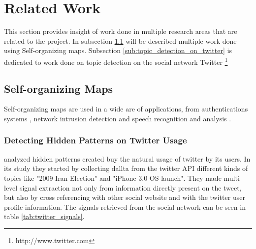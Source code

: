 \section{Related Work} %
\label{sec:related_work}

This section provides insight of work done in multiple research areas that are related to the project. In subsection \ref{sub:self_organizing_maps} will be described multiple work done using Self-organizing maps. Subsection \ref{sub:topic_detection_on_twitter} is dedicated to work done on topic detection on the social network Twitter \footnote{http://www.twitter.com}

\subsection{Self-organizing Maps} %
\label{sub:self_organizing_maps}
Self-organizing maps are used in a wide are of applications, from authentications systems \cite{Dozono2012}, network intrusion detection \cite{intrusion_som} and speech recognition and analysis \cite{phonetic_typewiter}.

\subsubsection{Detecting Hidden Patterns on Twitter Usage} %
\label{ssub:detecting_hidden_patterns_on_twitter_usage}

\citep{Cheong2010} analyzed hidden patterns created buy the natural usage of twitter by its users. In its study they started by collecting dallta from the twitter API different kinds of topics like "2009 Iran Election" and "iPhone 3.0 OS launch". They made multi level signal extraction not only from information directly present on the tweet, but also by cross referencing with other social website and with the twitter user profile information. The signals retrieved from the social network can be seen in table \ref{tab:twitter_signals}.

